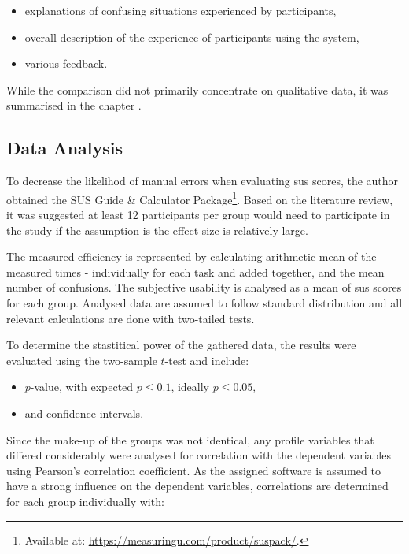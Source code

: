\begin{itemize}
    \item explanations of confusing situations experienced by participants,
    \item overall description of the experience of participants using the system,
    \item various feedback.
\end{itemize}

While the comparison did not primarily concentrate on qualitative data, it was summarised in the chapter .

\subsection{Data Analysis}

To decrease the likelihod of manual errors when evaluating \gls{sus} scores, the author obtained the SUS Guide \& Calculator Package\footnote{Available at: \url{https://measuringu.com/product/suspack/}.}.
Based on the  literature review, it was suggested at least 12 participants per group would need to participate in the study if the assumption is the effect size is relatively large.

The measured efficiency is represented by calculating arithmetic mean of the measured times - individually for each task and added together, and the mean number of confusions.
The subjective usability is analysed as a mean of \gls{sus} scores for each group.
Analysed data are assumed to follow standard distribution and all relevant calculations are done with two-tailed tests.

To determine the stastitical power of the gathered data, the results were evaluated using the two-sample $t$-test and include:

\begin{itemize}
    \item $p$-value, with expected $p \leq 0.1 $, ideally $p \leq 0.05 $,
    \item and confidence intervals.
\end{itemize}

Since the make-up of the groups was not identical, any profile variables that differed considerably were analysed for correlation with the dependent variables using Pearson's correlation coefficient.
As the assigned software is assumed to have a strong influence on the dependent variables, correlations are determined for each group individually with:

